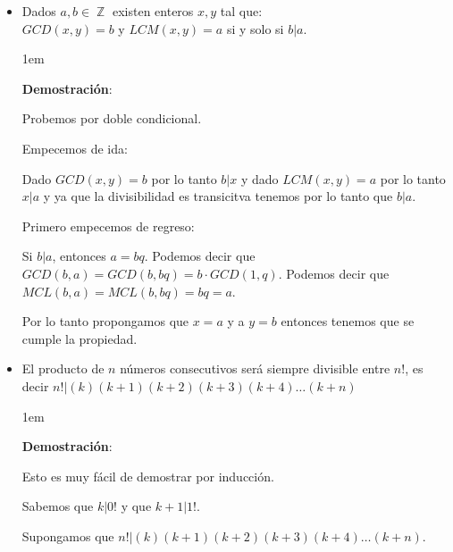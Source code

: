 \documentclass[12pt, fleqn]{report}                             %
\newenvironment{SmallIndentation}[1][0.75em]                    %
    {\begin{adjustwidth}{#1}{}\begin{footnotesize}}                 %
    {\end{footnotesize}\end{adjustwidth}}                           %
\DeclareMathOperator \Integers  {\mathbb{Z}}                     %
\begin{document}
\begin{itemize}
\begin{SmallIndentation}[1em]
                        Y bingo, demostrado ;)

                    \end{SmallIndentation}


                \item Dados $a, b \in \Integers$ existen enteros $x, y$ tal que:\\
                    $GCD(x, y) = b$  y $LCM(x, y) = a$ si y solo si $b|a$.

                    \begin{SmallIndentation}[1em]
                        \textbf{Demostración}:

                        Probemos por doble condicional.

                        Empecemos de ida:
                        
                        Dado $GCD(x, y) = b$ por lo tanto $b|x$ y dado $LCM(x, y) = a$ por lo tanto $x|a$
                        y ya que la divisibilidad es transicitva tenemos por lo tanto que $b|a$.


                        Primero empecemos de regreso:

                        Si $b|a$, entonces $a = bq$.
                        Podemos decir que $GCD(b, a) = GCD(b, bq) = b \cdot GCD(1, q)$.
                        Podemos decir que $MCL(b, a) = MCL(b, bq) = bq = a$.

                        Por lo tanto propongamos que $x=a$ y a $y=b$ entonces tenemos que 
                        se cumple la propiedad.

                    \end{SmallIndentation}

                \clearpage


                \item El producto de $n$ números consecutivos será siempre divisible entre
                    $n!$, es decir $n! | (k)(k+1)(k+2)(k+3)(k+4)\dots(k+n)$

                    \begin{SmallIndentation}[1em]
                        \textbf{Demostración}:

                        Esto es muy fácil de demostrar por inducción.

                        Sabemos que $k|0!$ y que $k+1|1!$.

                        Supongamos que $n! | (k)(k+1)(k+2)(k+3)(k+4)\dots(k+n)$.


\end{SmallIndentation}
\end{itemize}
\end{document}

